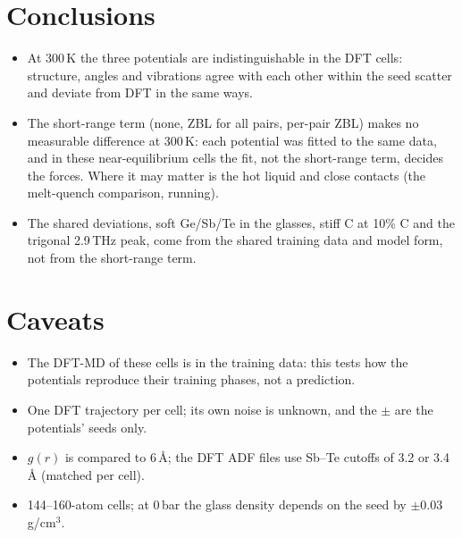 \documentclass[11pt]{article}
\begin{document}
\section{Conclusions}
\begin{itemize}
\item At 300\,K the three potentials are indistinguishable in the DFT cells: structure, angles and vibrations agree
with each other within the seed scatter and deviate from DFT in the same ways.
\item The short-range term (none, ZBL for all pairs, per-pair ZBL) makes no measurable difference at 300\,K: each
potential was fitted to the same data, and in these near-equilibrium cells the fit, not the short-range term,
decides the forces. Where it may matter is the hot liquid and close contacts (the melt-quench comparison, running).
\item The shared deviations, soft Ge/Sb/Te in the glasses, stiff C at 10\% C and the trigonal 2.9\,THz peak, come
from the shared training data and model form, not from the short-range term.
\end{itemize}

\section{Caveats}
\begin{itemize}
\item The DFT-MD of these cells is in the training data: this tests how the potentials reproduce their training
phases, not a prediction.
\item One DFT trajectory per cell; its own noise is unknown, and the $\pm$ are the potentials' seeds only.
\item $g(r)$ is compared to 6\,\AA; the DFT ADF files use Sb--Te cutoffs of 3.2 or 3.4\,\AA{} (matched per cell).
\item 144--160-atom cells; at 0\,bar the glass density depends on the seed by $\pm$0.03\,g/cm$^3$.
\end{itemize}
\end{document}
